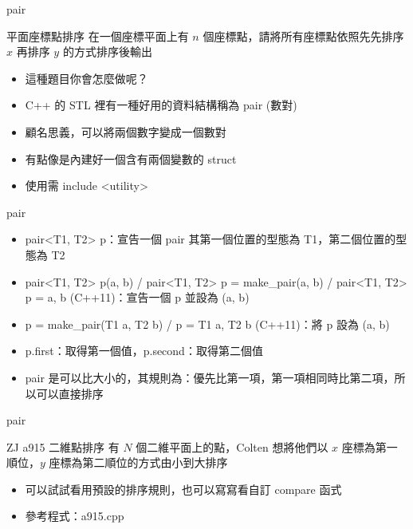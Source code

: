 \documentclass[aspectratio=169]{beamer}
\begin{document}
    \begin{frame}{pair}
        \begin{block}{平面座標點排序}
            在一個座標平面上有 $n$ 個座標點，請將所有座標點依照先先排序 $x$ 再排序 $y$ 的方式排序後輸出
        \end{block}
        
        \begin{itemize}
            \item<2-> 這種題目你會怎麼做呢？
            \item<3-> C++ 的 STL 裡有一種好用的資料結構稱為 pair (數對)
            \item<3-> 顧名思義，可以將兩個數字變成一個數對
            \item<4-> 有點像是內建好一個含有兩個變數的 struct
            \item<4-> 使用需 include <utility>
        \end{itemize}
    \end{frame}

    \begin{frame}{pair}
        \begin{itemize}
            \item<1-> pair<T1, T2> p：宣告一個 pair 其第一個位置的型態為 T1，第二個位置的型態為 T2
            \item<2-> pair<T1, T2> p(a, b) / pair<T1, T2> p = make\_pair(a, b) / pair<T1, T2> p = {a, b} (C++11)：宣告一個 p 並設為 (a, b)
            \item<3-> p = make\_pair(T1 a, T2 b) / p = {T1 a, T2 b} (C++11)：將 p 設為 (a, b)
            \item<4-> p.first：取得第一個值，p.second：取得第二個值
            \item<5-> pair 是可以比大小的，其規則為：優先比第一項，第一項相同時比第二項，所以可以直接排序
        \end{itemize}
    \end{frame}

    \begin{frame}{pair}
        \begin{block}{ZJ a915 二維點排序}
            有 $N$ 個二維平面上的點，Colten 想將他們以 $x$ 座標為第一順位，$y$ 座標為第二順位的方式由小到大排序
        \end{block}

        \begin{itemize}
            \item 可以試試看用預設的排序規則，也可以寫寫看自訂 compare 函式
            \item 參考程式：a915.cpp
        \end{itemize}
    \end{frame}
\end{document}
